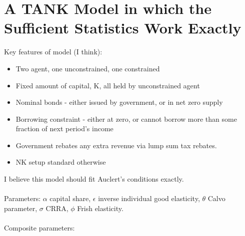 \documentclass[titlepage]{\econtex}\newcommand{\texname}{ConsumptionHeterogeneity}
\begin{document}
\section{A TANK Model in which the Sufficient Statistics Work Exactly}
Key features of model (I think):
\begin{itemize}
	\item Two agent, one unconstrained, one constrained
	\item Fixed amount of capital, K, all held by unconstrained agent
	\item Nominal bonds - either issued by government, or in net zero supply
	\item Borrowing constraint - either at zero, or cannot borrow more than some fraction of next period's income
	\item Government rebates any extra revenue via lump sum tax rebates.
	\item NK setup standard otherwise
\end{itemize}
I believe this model should fit Auclert's conditions exactly.\\
\\
Parameters: $\alpha$ capital share, $\epsilon$ inverse individual good elasticity, $\theta$ Calvo parameter, $\sigma$ CRRA, $\phi$ Frish elasticity.\\
\\
Composite parameters:
\end{document}
